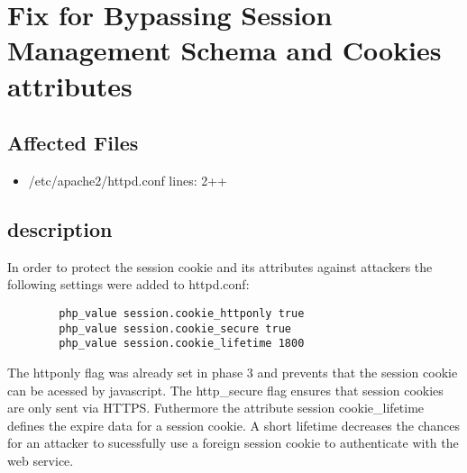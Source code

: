 \chapter{Fix for Bypassing Session Management Schema and Cookies attributes}
\section{Affected Files}

\begin{itemize}
\item /etc/apache2/httpd.conf lines: 2++
\end{itemize}

\section{description}
In order to protect the session cookie and its attributes against attackers the following settings were added to httpd.conf:

\begin{lstlisting}
	    php_value session.cookie_httponly true
	    php_value session.cookie_secure true
	    php_value session.cookie_lifetime 1800
\end{lstlisting}

The httponly flag was already set in phase 3 and prevents that the session cookie can be acessed by javascript.
The http\_secure flag ensures that session cookies are only sent via HTTPS. \newline
Futhermore the attribute session cookie\_lifetime defines the expire data for a session cookie. A short lifetime decreases the chances for an attacker to sucessfully use a foreign session cookie to authenticate with the web service.


